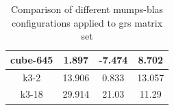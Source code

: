 \begin{table}[h!]
\begin{tabular}{|c|c|c|c|}
cube-645                                              & 1.897                                                                                                   & -7.474                                                                                               & 8.702                                                                                                   \\ \hline
k3-2                                                  & 13.906                                                                                                  & 0.833                                                                                                & 13.057                                                                                                  \\ \hline
k3-18                                                 & 29.914                                                                                                  & 21.03                                                                                                & 11.29                                                                                                   \\ \hline
\end{tabular}
\caption{Comparison of different \gls{mumps}-\gls{blas} configurations applied to \gls{grs} matrix set}
\label{table:mumps-blas-performance-gain-grs}
\end{table}



